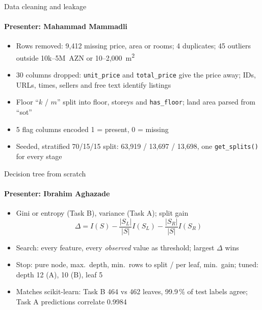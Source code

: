 \documentclass[14pt,aspectratio=169]{beamer}
\newcommand{\presenter}[1]{\framesubtitle{Presenter: #1}}
\newcommand{\gap}{\setlength{\itemsep}{0.45em}}
\begin{document}
\begin{frame}{Data cleaning and leakage}
  \presenter{Mahammad Mammadli}
  \begin{itemize}\gap
    \item Rows removed: 9{,}412 missing price, area or rooms; %
      4 duplicates; %
      45 outliers outside 10k--5M~AZN or 10--2{,}000~m\textsuperscript{2} %
    \item 30 columns dropped: \texttt{unit\_price} and \texttt{total\_price} %
      give the price away; IDs, URLs, times, sellers and free text identify listings %
    \item Floor ``$k$ / $m$'' split into floor, storeys and \texttt{has\_floor}; land area parsed from ``sot'' %
    \item 5 flag columns encoded 1 = present, 0 = missing %
    \item Seeded, stratified 70/15/15 split: 63{,}919 / 13{,}697 / 13{,}698, %
      one \texttt{get\_splits()} for every stage %
  \end{itemize}
\end{frame}

\begin{frame}{Decision tree from scratch}
  \presenter{Ibrahim Aghazade}
  \begin{itemize}\gap
    \item Gini or entropy (Task B), variance (Task A); split gain %
      \[\Delta = I(S) - \frac{|S_L|}{|S|} I(S_L) - \frac{|S_R|}{|S|} I(S_R)\]
    \item Search: every feature, every \emph{observed} value as threshold;
      largest $\Delta$ wins %
    \item Stop: pure node, max.\ depth, min.\ rows to split / per leaf, %
      min.\ gain; tuned: depth 12 (A), 10 (B), leaf 5 %
    \item Matches scikit-learn: Task B 464 vs 462 leaves, %
      99.9\,\% of test labels agree; %
      Task A predictions correlate 0.9984 %
  \end{itemize}
\end{frame}
\end{document}
